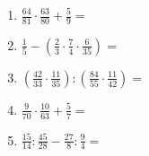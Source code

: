 \begin{Exercise}[title={Berechne die folgenden Ausdrücke und kürze soweit wie möglich}, label=bruecheA1]
\begin{minipage}{\textwidth}
\begin{minipage}{0.49\textwidth}
\begin{enumerate}[label=\alph*)]
				\item \(\frac{64}{81}\cdot\frac{63}{80}+\frac{5}{9}=\)
				\item \(\frac{1}{5}-\left( \frac{2}{3}\cdot \frac{7}{4}\cdot \frac{6}{35}\right) =\)
				\item \(\left( \frac{42}{33}\cdot\frac{11}{35}\right):\left(\frac{84}{55}\cdot\frac{11}{42}\right)  =\)
				\item \(\frac{9}{70}\cdot\frac{10}{63}+\frac{5}{7}=\)
				\item \(\frac{15}{14}:\frac{45}{28}-\frac{27}{8}:\frac{9}{4}=\)
			\end{enumerate}
		\end{minipage}
	\end{minipage}
\end{Exercise}
\newpage
\begin{Answer}[ref=bruecheA1]
	

\end{Answer}
